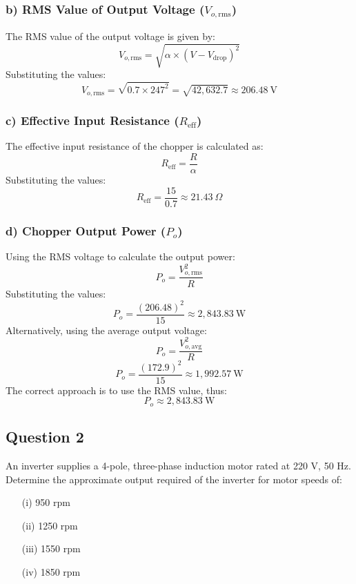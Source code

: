 \documentclass[12pt]{report}
\begin{document}
     \subsubsection*{b) RMS Value of Output Voltage (\( V_{o,\text{rms}} \))}
     The RMS value of the output voltage is given by:
     \[
     V_{o,\text{rms}} = \sqrt{\alpha \times (V - V_{\text{drop}})^2}
     \]
     Substituting the values:
     \[
     V_{o,\text{rms}} = \sqrt{0.7 \times 247^2} = \sqrt{42,632.7} \approx 206.48 \ \text{V}
     \]
     
     \subsubsection*{c) Effective Input Resistance (\( R_{\text{eff}} \))}
     The effective input resistance of the chopper is calculated as:
     \[
     R_{\text{eff}} = \frac{R}{\alpha}
     \]
     Substituting the values:
     \[
     R_{\text{eff}} = \frac{15}{0.7} \approx 21.43 \ \Omega
     \]
     
     \subsubsection*{d) Chopper Output Power (\( P_o \))}
     Using the RMS voltage to calculate the output power:
     \[
     P_o = \frac{V_{o,\text{rms}}^2}{R}
     \]
     Substituting the values:
     \[
     P_o = \frac{(206.48)^2}{15} \approx 2,843.83 \ \text{W}
     \]
     Alternatively, using the average output voltage:
     \[
     P_o = \frac{V_{o,\text{avg}}^2}{R}
     \]
     \[
     P_o = \frac{(172.9)^2}{15} \approx 1,992.57 \ \text{W}
     \]
     The correct approach is to use the RMS value, thus:
     \[
     \boxed{P_o \approx 2,843.83 \ \text{W}}
     \]

	
	
	\subsection*{Question 2}
	An inverter supplies a 4-pole, three-phase induction motor rated at 220 V, 50 Hz. Determine the approximate output required of the inverter for motor speeds of:
	\begin{enumerate}
		\item[(i)] 950 rpm
		\item[(ii)] 1250 rpm
		\item[(iii)] 1550 rpm
		\item[(iv)] 1850 rpm
	\end{enumerate}
	
\end{document}

